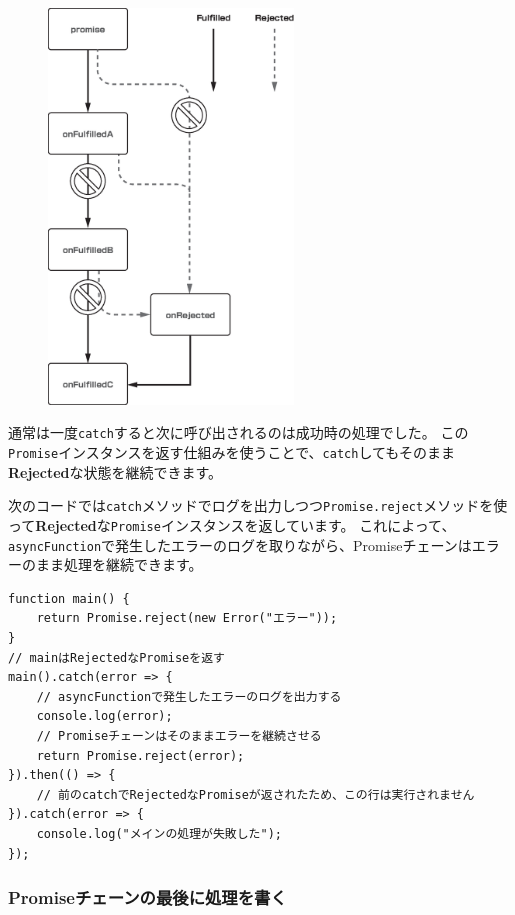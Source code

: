 \begin{figure}[h]
\centering
\includegraphics[width=65mm]{./fig/then-rejected-promise.eps}
\end{figure}

通常は一度\texttt{catch}すると次に呼び出されるのは成功時の処理でした。
この\texttt{Promise}インスタンスを返す仕組みを使うことで、\texttt{catch}してもそのまま\textbf{Rejected}な状態を継続できます。

次のコードでは\texttt{catch}メソッドでログを出力しつつ\texttt{Promise.reject}メソッドを使って\textbf{Rejected}な\texttt{Promise}インスタンスを返しています。
これによって、\texttt{asyncFunction}で発生したエラーのログを取りながら、Promiseチェーンはエラーのまま処理を継続できます。

\begin{lstlisting}
function main() {
    return Promise.reject(new Error("エラー"));
}
// mainはRejectedなPromiseを返す
main().catch(error => {
    // asyncFunctionで発生したエラーのログを出力する
    console.log(error);
    // Promiseチェーンはそのままエラーを継続させる
    return Promise.reject(error);
}).then(() => {
    // 前のcatchでRejectedなPromiseが返されたため、この行は実行されません
}).catch(error => {
    console.log("メインの処理が失敗した");
});
\end{lstlisting}

\hypertarget{promise-finally}{%
\subsubsection{Promiseチェーンの最後に処理を書く\,\protect{}}\label{promise-finally}}

